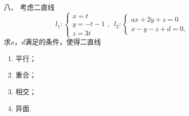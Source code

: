 \begin{enumerate}
\begin{enumerate}[label=(\arabic*)]
    \end{enumerate}
    \item[八、]考虑二直线
    \[l_1:\begin{cases}
        x=t \\ y=-t-1 \\ z=3t
    \end{cases},\enspace l_2:\begin{cases}
        ax+2y+z=0 \\ x-y-z+d=0,
    \end{cases}\]
    求$a$，$d$满足的条件，使得二直线
    \begin{enumerate}[label=(\arabic*)]
        \item 平行；
        \item 重合；
        \item 相交；
        \item 异面.
    \end{enumerate}
\end{enumerate}


\clearpage
